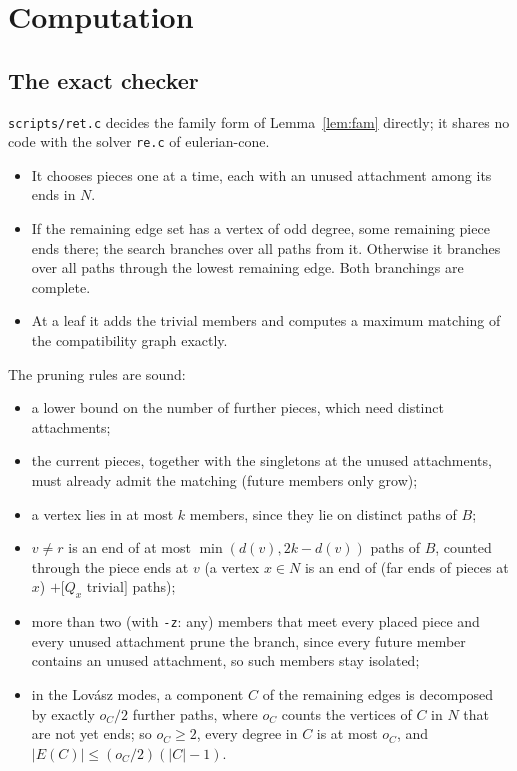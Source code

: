 \documentclass[11pt]{amsart}
\theoremstyle{definition}
\begin{document}
\section{Computation}\label{sec:comp}

\subsection{The exact checker}
\texttt{scripts/ret.c} decides the family form of Lemma~\ref{lem:fam} directly; it shares no code
with the solver \texttt{re.c} of eulerian-cone.
\begin{itemize}[leftmargin=*]
\item It chooses pieces one at a time, each with an unused attachment among its ends in $N$.
\item If the remaining edge set has a vertex of odd degree, some remaining piece ends there; the search
branches over all paths from it. Otherwise it branches over all paths through the lowest remaining
edge. Both branchings are complete.
\item At a leaf it adds the trivial members and computes a maximum matching of the compatibility
graph exactly.
\end{itemize}
The pruning rules are sound:
\begin{itemize}[leftmargin=*]
\item a lower bound on the number of further pieces, which need distinct attachments;
\item the current pieces, together with the singletons at the unused attachments, must already admit
the matching (future members only grow);
\item a vertex lies in at most $k$ members, since they lie on distinct paths of $B$;
\item $v\ne r$ is an end of at most $\min(d(v),2k-d(v))$ paths of $B$, counted through the piece
ends at $v$ (a vertex $x\in N$ is an end of (far ends of pieces at $x$) $+[Q_x$ trivial$]$ paths);
\item more than two (with \texttt{-z}: any) members that meet every placed piece and every unused
attachment prune the branch, since every future member contains an unused attachment, so such members
stay isolated;
\item in the Lov\'asz modes, a component $C$ of the remaining edges is decomposed by exactly $o_C/2$
further paths, where $o_C$ counts the vertices of $C$ in $N$ that are not yet ends; so $o_C\ge2$, every
degree in $C$ is at most $o_C$, and $|E(C)|\le (o_C/2)(|C|-1)$.
\end{itemize}
\end{document}
